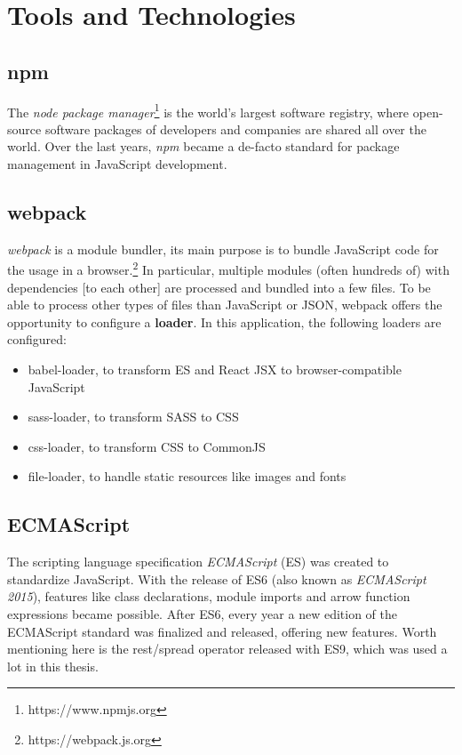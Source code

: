 \documentclass[a4paper,12pt,pdftex,halfparskip,cleardoubleempty,bibtotoc,liststotoc]{scrbook}
\begin{document}
\section{Tools and Technologies}
\subsection{npm}

The \textit{node package manager}\footnote{https://www.npmjs.org} is the world's largest software registry, where open-source software packages of developers and companies are shared all over the world. Over the last years, \textit{npm} became a de-facto standard for package management in JavaScript development.

\subsection{webpack}

\textit{webpack} is a module bundler, its main purpose is to bundle JavaScript code for the usage in a browser.\footnote{https://webpack.js.org} In particular, multiple modules (often hundreds of) with dependencies [to each other] are processed and bundled into a few files. To be able to process other types of files than JavaScript or JSON, webpack offers the opportunity to configure a \textbf{loader}. In this application, the following loaders are configured:
\begin{itemize}
\item babel-loader, to transform ES and React JSX to browser-compatible JavaScript
\item sass-loader, to transform SASS to CSS
\item css-loader, to transform CSS to CommonJS
\item file-loader, to handle static resources like images and fonts
\end{itemize}

\subsection{ECMAScript}

The scripting language specification \textit{ECMAScript} (ES) was created to standardize JavaScript. With the release of ES6 (also known as \textit{ECMAScript 2015}), features like class declarations, module imports and arrow function expressions became possible. After ES6, every year a new edition of the ECMAScript standard was finalized and released, offering new features. Worth mentioning here is the rest/spread operator released with ES9, which was used a lot in this thesis.
\end{document}
